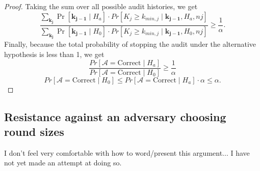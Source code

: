\begin{proof}
Taking the sum over all possible audit histories, we get
$$
\frac{\sum_{\bm{k_j}}\Pr[\bm{k_{j-1}} \mid H_a]\cdot Pr[K_{j} \ge k_{min, j} \mid \bm{k_{j-1}}, H_a, n{j}]}{\sum_{\bm{k_j}}\Pr[\bm{k_{j-1}} \mid H_0]\cdot Pr[K_{j} \ge k_{min, j} \mid \bm{k_{j-1}}, H_0, n{j}]}\ge \frac{1}{\alpha}.
$$
Finally, because the total probability of stopping the audit under
the alternative hypothesis is less than 1, we get
$$
\frac{Pr[\mathcal{A}=\text{Correct} \mid H_a]}{Pr[\mathcal{A}=\text{Correct} \mid H_0]}\ge \frac{1}{\alpha}
$$
$$
Pr[\mathcal{A}=\text{Correct} \mid H_0]
\le
Pr[\mathcal{A}=\text{Correct} \mid H_a] \cdot \alpha
\le
\alpha.
$$
\end{proof}

\subsection{Resistance against an adversary choosing round sizes}
I don't feel very comfortable with how to word/present this argument... I have not yet made an attempt at doing so.
